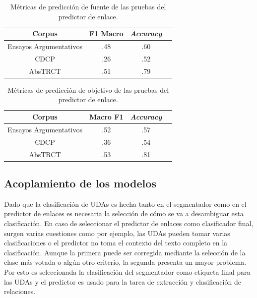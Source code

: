 \begin{table}[h!]
	\begin{center}
		\begin{tabular}{|c|c|c|c|} \hline
        Corpus		            & F1 Macro  & \emph{Accuracy} \\ \hline
        Ensayos Argumentativos  & .48       & .60             \\ \hline
        CDCP		            & .26       & .52	         \\ \hline
        AbsTRCT	                & .51       & .79	         \\ \hline
        \end{tabular}
	\caption{Métricas de predicción de fuente de las pruebas del predictor de enlace.}\label{table:test_source_metrics_link_predictor}
	\end{center}
\end{table}

\begin{table}[h!]
	\begin{center}
		\begin{tabular}{|c|c|c|c|} \hline
        Corpus		            & Macro F1 & \emph{Accuracy} \\ \hline
        Ensayos Argumentativos  & .52	   & .57             \\ \hline
        CDCP		            & .36	   & .54	         \\ \hline
        AbsTRCT	                & .53	   & .81	         \\ \hline
        \end{tabular}
	\caption{Métricas de predicción de objetivo de las pruebas del predictor de enlace.}\label{table:test_target_metrics_link_predictor}
	\end{center}
\end{table}

\subsection{Acoplamiento de los modelos}

Dado que la clasificación de UDAs es hecha tanto en el segmentador como en el predictor de enlaces es necesaria 
la selección de cómo se va a desambiguar esta clasificación. En caso de seleccionar el predictor de enlaces como 
clasificador final, surgen varias cuestiones como por ejemplo, las UDAs pueden tomar varias clasificaciones o el
predictor no toma el contexto del texto completo en la clasificación. Aunque la primera puede ser corregida
mediante la selección de la clase más votada o algún otro criterio, la segunda presenta un mayor problema. Por
esto es seleccionada la clasificación del segmentador como etiqueta final para las UDAs y el predictor es usado para 
la tarea de extracción y clasificación de relaciones.

